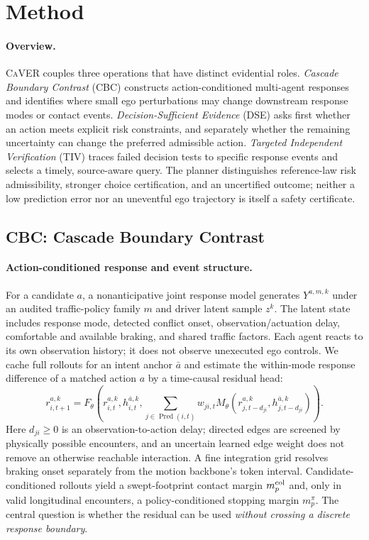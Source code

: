 \documentclass[10pt]{article}
\newcommand{\method}{\textsc{CaVER}}
\begin{document}
\section{Method}
\label{sec:method}
\paragraph{Overview.}
\method{} couples three operations that have distinct evidential roles. \emph{Cascade Boundary Contrast} (CBC) constructs action-conditioned multi-agent responses and identifies where small ego perturbations may change downstream response modes or contact events. \emph{Decision-Sufficient Evidence} (DSE) asks first whether an action meets explicit risk constraints, and separately whether the remaining uncertainty can change the preferred admissible action. \emph{Targeted Independent Verification} (TIV) traces failed decision tests to specific response events and selects a timely, source-aware query. The planner distinguishes reference-law risk admissibility, stronger choice certification, and an uncertified outcome; neither a low prediction error nor an uneventful ego trajectory is itself a safety certificate.

\subsection{CBC: Cascade Boundary Contrast}
\label{sec:cbc}
\paragraph{Action-conditioned response and event structure.}
For a candidate $a$, a nonanticipative joint response model generates $Y^{a,m,k}$ under an audited traffic-policy family $m$ and driver latent sample $z^k$. The latent state includes response mode, detected conflict onset, observation/actuation delay, comfortable and available braking, and shared traffic factors. Each agent reacts to its own observation history; it does not observe unexecuted ego controls. We cache full rollouts for an intent anchor $\bar a$ and estimate the within-mode response difference of a matched action $a$ by a time-causal residual head:
\begin{equation}
 r_{i,t+1}^{a,k}=F_\theta\!\left(r_{i,t}^{a,k},h_{i,t}^{\bar a,k},
 \sum_{j\in\operatorname{Pred}(i,t)} w_{ji,t}
 M_\theta(r_{j,t-d_{ji}}^{a,k},h_{j,t-d_{ji}}^{\bar a,k})\right).
 \label{eq:transport}
\end{equation}
Here $d_{ji}\ge0$ is an observation-to-action delay; directed edges are screened by physically possible encounters, and an uncertain learned edge weight does not remove an otherwise reachable interaction. A fine integration grid resolves braking onset separately from the motion backbone's token interval. Candidate-conditioned rollouts yield a swept-footprint contact margin $m_p^{\rm col}$ and, only in valid longitudinal encounters, a policy-conditioned stopping margin $m_p^\pi$. The central question is whether the residual can be used \emph{without crossing a discrete response boundary}.
\end{document}
